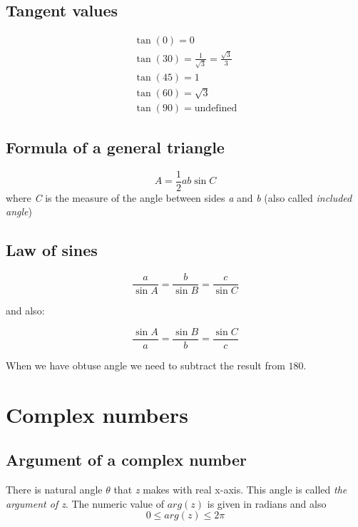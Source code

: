 \documentclass{article}
\begin{document}

\subsection{Tangent values}
\begin{equation}
  \begin{gathered}
    \tan(0) = 0 \\
    \tan(30) = \frac{1}{\sqrt{3}} = \frac{\sqrt{3}}{3} \\
    \tan(45) = 1 \\
    \tan(60) = \sqrt{3} \\
    \tan(90) = \text{undefined}
  \end{gathered}
\end{equation}

\subsection{Formula of a general triangle}

\begin{equation}
  A = \frac{1}{2}ab \sin{C}
\end{equation}
where \textit{C} is the measure of the angle between sides \textit{a} and \textit{b} (also called \textit{included angle})

\subsection{Law of sines}

\begin{equation}
  \frac{a}{\sin A} = \frac{b}{\sin B} = \frac{c}{\sin C}
\end{equation}

and also:

\begin{equation}
  \frac{\sin A}{a} = \frac{\sin B}{b} = \frac{\sin C}{c}
\end{equation}

When we have obtuse angle we need to subtract the result from $180$.


\section{Complex numbers}
\subsection{Argument of a complex number}
There is natural angle $\theta$ that \textit{z} makes with real x-axis. This angle is called \textit{the argument of z}. The numeric value of $arg(z)$ is given in radians and also
\begin{equation}
0 \leq arg(z) \leq 2\pi
\end{equation}
\end{document}
